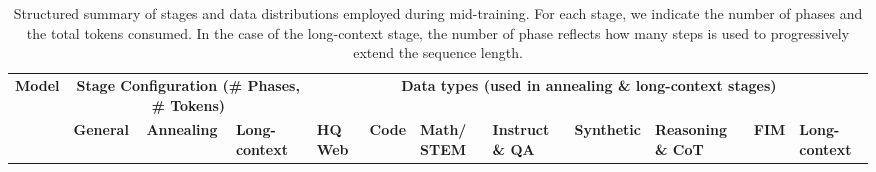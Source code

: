 \begin{table}[h]
\centering
\scriptsize
\caption{Structured summary of stages and data distributions employed during mid-training. For each stage, we indicate the number of phases and the total tokens consumed. In the case of the long-context stage, the number of phase reflects how many steps is used to progressively extend the sequence length.}
\label{fig:data_distribution_in_various_model}
\begin{adjustbox}{width=\textwidth}
\begin{tabularx}{\textwidth}{l| lll |*{8}{>{\centering\arraybackslash}X}}
\toprule
\textbf{Model} & \multicolumn{3}{c|}{\textbf{Stage Configuration (\# Phases, \# Tokens)}} & \multicolumn{8}{c}{\textbf{Data types (used in annealing \& long-context stages)}} \\
\cmidrule(lr){2-4} \cmidrule(lr){5-12}
& \textbf{General} & \textbf{Annealing} & \textbf{Long-context} & \textbf{HQ Web} & \textbf{Code} & \textbf{Math/ STEM} & \textbf{Instruct \& QA} & \textbf{Synthetic} & \textbf{Reasoning \& CoT} & \textbf{FIM} & \textbf{Long-context} \\


\end{tabularx}
\end{adjustbox}
\end{table}
